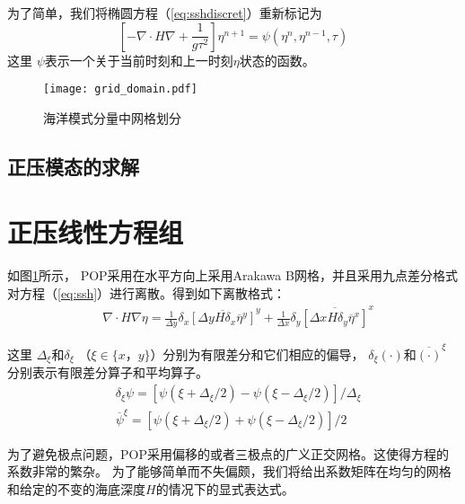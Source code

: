 为了简单，我们将椭圆方程（\ref{eq:sshdiscret}）重新标记为
\begin{equation}
\label{eq:ssh}
[-\nabla \cdot H\nabla +\frac{1}{g  \tau^2}]\eta^{n+1} = \psi(\eta^n,\eta^{n-1},\tau)
\end{equation}
这里 $\psi$表示一个关于当前时刻和上一时刻$\eta$状态的函数。
 

\begin{figure}%
\centering
\texttt{[image: grid\_domain.pdf]}
\caption[] {海洋模式分量中网格划分\label{fig:grid1}}
\end{figure}

\subsection{正压模态的求解}
\label{related:barosolver}
 

\section{正压线性方程组}
\label{related:baroproperty}

如图\ref{fig:grid1}所示， POP采用在水平方向上采用Arakawa B网格\cite{smith2010parallel}，并且采用九点差分格式对方程（\ref{eq:ssh}）进行离散。得到如下离散格式：
\begin{align}
    & \nabla\cdot H \nabla \eta  =\frac{1}{\Delta y}\delta_x \overline{[\Delta y H  \delta_x\overline{\eta}^y]}^y +\frac{1}{\Delta x}\delta_y \overline{[\Delta x H  \delta_y\overline{\eta}^x]}^x \label{eq:nabla2}
  \end{align}

这里 $\Delta_\xi$和$\delta_\xi$  （$\xi \in \{x， y\} $）分别为有限差分和它们相应的偏导，  $\delta_\xi (\cdot) $和$\overline{(\cdot)}^\xi $ 分别表示有限差分算子和平均算子。  
\begin{align}
&\delta_\xi \psi = [\psi (\xi+\Delta_\xi/2) -\psi(\xi-\Delta_\xi/2)]/\Delta_\xi \\
&\overline{\psi}^\xi  =[\psi (\xi+\Delta_\xi/2) +\psi(\xi-\Delta_\xi/2)]/2
\end{align}


为了避免极点问题，POP采用偏移的或者三极点的广义正交网格。这使得方程的系数非常的繁杂。
为了能够简单而不失偏颇，我们将给出系数矩阵在均匀的网格和给定的不变的海底深度$H$的情况下的显式表达式。
 

